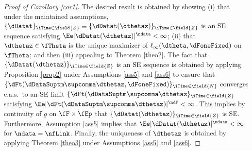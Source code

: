 \proofskip
\begin{proof}[Proof of Corollary \ref{cor1}]
The desired result is obtained by showing (i) that under the maintained assumptions, $\{\dDatat\}_{\iTime \in \field{Z}} \equiv \{\dDatat(\dthetaz)\}_{\iTime \in \field{Z}}$ is an SE sequence satisfying $\Ee|\dDatat(\dthetaz)|^{\ndata}<\infty$; (ii) that $\dthetaz \in \fTheta$ is the unique maximizer of $\ell_{\infty}(\dtheta,\dFoneFixed)$ on $\fTheta$; and then (iii) appealing to Theorem \ref{theo2}. The fact that $\{\dDatat(\dthetaz)\}_{\iTime \in \field{Z}}$ is an SE sequence is obtained by applying Proposition \ref{prop2} under Assumptions \ref{ass5} and \ref{ass6} to ensure that  $\{\dFt(\dDataSuptm\supcomma\dthetaz,\dFoneFixed)\}_{\iTime \in \field{N}}$ converges e.a.s.~to an SE limit $\{\dFt(\dDataSuptm\supcomma\dthetaz\}_{\iTime \in \field{Z}}$ satisfying $\Ee|\dFt(\dDataSuptm\supcomma\dthetaz)|^{\ndF}<\infty$. This implies by continuity of $g$ on $\fF\times \fEp$ 
that $\{\dDatat(\dthetaz)\}_{\iTime \in \field{Z}}$ is SE. 
Furthermore, Assumption \ref{ass5} implies that $\Ee|\dDatat(\dthetaz)|^{\ndata}<\infty$ for $\ndata = \nfLink$.
Finally, the uniqueness of $\dthetaz$ is obtained by applying Theorem \ref{theo3} under Assumptions \ref{ass5} and \ref{ass6}.
\end{proof}



